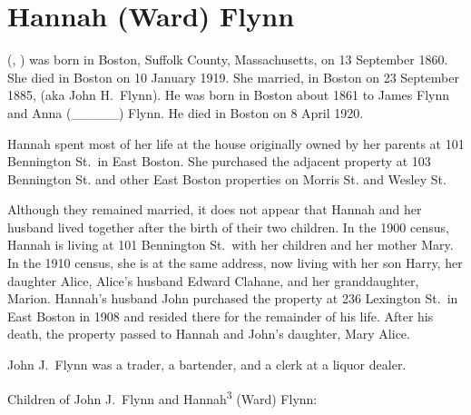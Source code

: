 \section{Hannah (Ward) Flynn}

 (, ) was born in Boston, Suffolk County, Massachusetts, on 13 September 1860.\cite{Hannah3WardBirth} She died in Boston on 10 January 1919.\cite{Hannah3WardDeath} She married, in Boston on 23 September 1885, \cite{Hannah3WardMarriage} (aka John H.\ Flynn\cite{JohnJHFlynn}). He was born in Boston about 1861 to James Flynn and Anna (\_\_\_\_\_) Flynn.\cite{Hannah3WardMarriage} He died in Boston on 8 April 1920.\cite{JohnFlynnDeath}

Hannah spent most of her life at the house originally owned by her parents at 101 Bennington St.\ in East Boston.\cite{101Bennington,Census1880DavidWard,Census1910HannahWard} She purchased the adjacent property at 103 Bennington St.\cite{103BenningtonSt} and other East Boston properties on Morris St.\cite{MorrisSt} and Wesley St.\cite{WesleySt} 

Although they remained married, it does not appear that Hannah and her husband lived together after the birth of their two children.\cite{HannahWardDirectories} In the 1900 census, Hannah is living at 101 Bennington St.\ with her children and her mother Mary.\cite{Census1900HannahWard} In the 1910 census, she is at the same address, now living with her son Harry, her daughter Alice, Alice's husband Edward Clahane, and her granddaughter, Marion.\cite{Census1910HannahWard} Hannah's husband John purchased the property at 236 Lexington St.\ in East Boston in 1908 and resided there for the remainder of his life.\cite{236Lexington,JohnFlynnDeath} After his death, the property passed to Hannah and John's daughter, Mary Alice.\cite{236Lexington2}

John J.\ Flynn was a trader,\cite{Hannah3WardMarriage} a bartender,\cite{Harry4FlynnBirth} and a clerk at a liquor dealer.\cite{JohnFlynn1889,BropheyLiquors}

\begin{KidsIntro}
	Children of John J.\ Flynn and Hannah\textsuperscript{3} (Ward) Flynn:
\end{KidsIntro}

